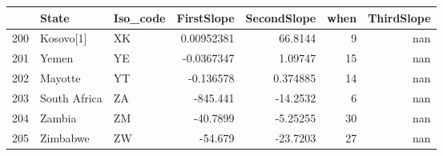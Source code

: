 \begin{tabular}{rllrrrr}
\hline
     & State        & Iso\_code   &    FirstSlope &   SecondSlope &   when &   ThirdSlope \\
\hline
 200 & Kosovo[1]    & XK         &    0.00952381 &     66.8144   &      9 &          nan \\
 201 & Yemen        & YE         &   -0.0367347  &      1.09747  &     15 &          nan \\
 202 & Mayotte      & YT         &   -0.136578   &      0.374885 &     14 &          nan \\
 203 & South Africa & ZA         & -845.441      &    -14.2532   &      6 &          nan \\
 204 & Zambia       & ZM         &  -40.7899     &     -5.25255  &     30 &          nan \\
 205 & Zimbabwe     & ZW         &  -54.679      &    -23.7203   &     27 &          nan \\
\hline
\end{tabular}